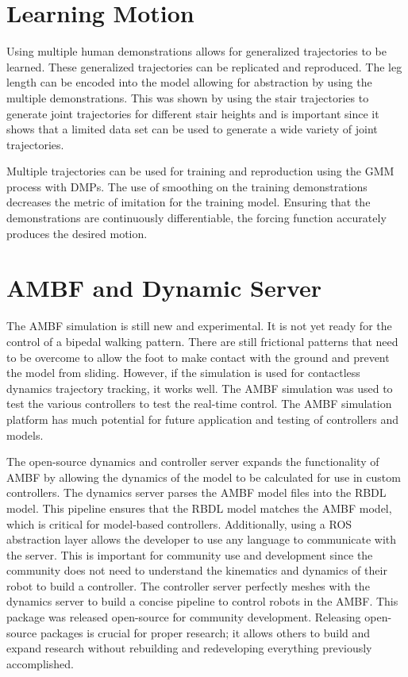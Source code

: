 \section{Learning Motion}


Using multiple human demonstrations allows for generalized trajectories to be learned. These generalized trajectories can be replicated and reproduced. The leg length can be encoded into the model allowing for abstraction by using the multiple demonstrations. This was shown by using the stair trajectories to generate joint trajectories for different stair heights and is important since it shows that a limited data set can be used to generate a wide variety of joint trajectories. 

Multiple trajectories can be used for training and reproduction using the GMM process with DMPs. The use of smoothing on the training demonstrations decreases the metric of imitation for the training model. Ensuring that the demonstrations are continuously differentiable, the forcing function accurately produces the desired motion. 

\section{AMBF and Dynamic Server}


The AMBF simulation is still new and experimental. It is not yet ready for the control of a bipedal walking pattern. There are still frictional patterns that need to be overcome to allow the foot to make contact with the ground and prevent the model from sliding. However, if the simulation is used for contactless dynamics trajectory tracking, it works well. The AMBF simulation was used to test the various controllers to test the real-time control. The AMBF simulation platform has much potential for future application and testing of controllers and models. 

The open-source dynamics and controller server expands the functionality of AMBF by allowing the dynamics of the model to be calculated for use in custom controllers. The dynamics server parses the AMBF model files into the RBDL model. This pipeline ensures that the RBDL model matches the AMBF model, which is critical for model-based controllers. Additionally, using a ROS abstraction layer allows the developer to use any language to communicate with the server. This is important for community use and development since the community does not need to understand the kinematics and dynamics of their robot to build a controller. The controller server perfectly meshes with the dynamics server to build a concise pipeline to control robots in the AMBF. This package was released open-source for community development. Releasing open-source packages is crucial for proper research; it allows others to build and expand research without rebuilding and redeveloping everything previously accomplished.   


